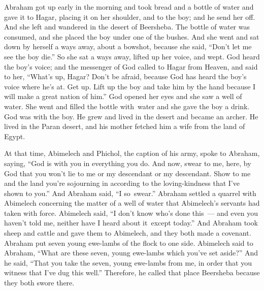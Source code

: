 \begin{inparaenum}
     Abraham got up early in the morning and took bread and a bottle of water and gave it to Hagar, placing it on her shoulder, and to the boy; and he send her off. And she left and wandered in the desert of Beersheba.%
     The bottle of water was consumed, and she placed the boy under one of the bushes.%
     And she went and sat down by herself a ways away, about a bowshot, because she said, ``Don't let me see the boy die.'' So she sat a ways away, lifted up her voice, and wept.%
     God heard the boy's voice; and the messenger of God called to Hagar from Heaven, and said to her, ``What's up, Hagar? Don't be afraid, because God has heard the boy's voice where he's at.%
     Get up. Lift up the boy and take him by the hand because I will make a great nation of him.''%
     God opened her eyes and she saw a well of water. She went and filled the bottle with\understood\ water and she gave the boy a drink.%
     God was with the boy. He grew and lived in the desert and became an archer.%
     He lived in the Paran desert, and his mother fetched him a wife from the land of Egypt.%
    
     At that time, Abimelech and Phichol, the caption of his army, spoke to Abraham, saying, ``God is with you in everything you do.%
     And now, swear to me, here, by God that you won't lie to me or my descendant or my descendant. Show to me and the land you're sojourning in according to the loving-kindness that I've shown to you.''%
     And Abraham said, ``I so\understood\ swear.''%
     Abraham settled a quarrel with Abimelech concerning the matter of a well of water that Abimelech's servants had taken with force.%
     Abimelech said, ``I don't know who's done this~--- and even you haven't told me, neither have I heard {about it}\understood\ except today.''%
     And Abraham took sheep and cattle and gave them to Abimelech, and they both made a covenant.%
     Abraham put seven young ewe-lambs of the flock to one side.%
     Abimelech said to Abraham, ``What are these seven, young ewe-lambs which you've set aside?''%
     And he said, ``That you take the seven, young ewe-lambs from me, in order that you witness that I've dug this well.''%
     Therefore, he called that place Beersheba because they both swore there.%
\end{inparaenum}

